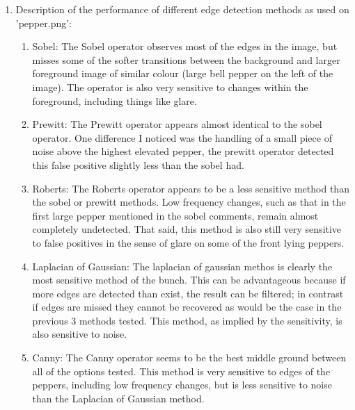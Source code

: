 \documentclass[10pt]{article}
\begin{document}
\begin{enumerate}
\begin{enumerate}
\item Description of the performance of different edge detection methods as used on 'pepper.png':
\begin{enumerate}
\item Sobel: The Sobel operator observes most of the edges in the image, but misses some of the softer transitions between the background and larger foreground image of similar colour (large bell pepper on the left of the image). The operator is also very sensitive to changes within the foreground, including things like glare.
\item Prewitt: The Prewitt operator appears almost identical to the sobel operator. One difference I noticed was the handling of a small piece of noise above the highest elevated pepper, the prewitt operator detected this false positive slightly less than the sobel had.
\item Roberts: The Roberts operator appears to be a less sensitive method than the sobel or prewitt methods. Low frequency changes, such as that in the first large pepper mentioned in the sobel comments, remain almost completely undetected. That said, this method is also still very sensitive to false positives in the sense of glare on some of the front lying peppers.
\item Laplacian of Gaussian: The laplacian of gaussian methos is clearly the most sensitive method of the bunch. This can be advantageous because if more edges are detected than exist, the result can be filtered; in contrast if edges are missed they cannot be recovered as would be the case in the previous 3 methods tested. This method, as implied by the sensitivity, is also sensitive to noise.
\item Canny: The Canny operator seems to be the best middle ground between all of the options tested. This method is very sensitive to edges of the peppers, including low frequency changes, but is less sensitive to noise than the Laplacian of Gaussian method.
\end{enumerate}
\end{enumerate}


\end{enumerate}
\end{document}
